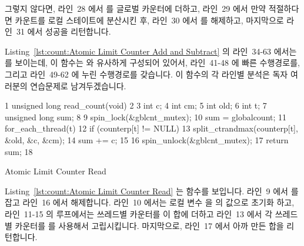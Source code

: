 그렇지 않다면, 라인~28 에서  를 글로벌 카운터에 더하고, 라인~29 에서
만약 적절하다면 카운트를 로컬 스테이트에 분산시킨 후, 라인~30 에서
 를 해제하고, 마지막으로 라인~31 에서 성공을 리턴합니다.

Listing~\ref{lst:count:Atomic Limit Counter Add and Subtract} 의 라인~34-63
에서는  를 보이는데, 이 함수는  와 유사하게
구성되어 있어서, 라인~41-48 에 빠른 수행경로를, 그리고 라인~49-62 에 누린
수행경로를 갖습니다.
이 함수의 각 라인별 분석은 독자 여러분의 연습문제로 남겨두겠습니다.

\begin{listing}[tbp]
{ \scriptsize
\begin{verbbox}
  1 unsigned long read_count(void)
  2 {
  3   int c;
  4   int cm;
  5   int old;
  6   int t;
  7   unsigned long sum;
  8 
  9   spin_lock(&gblcnt_mutex);
 10   sum = globalcount;
 11   for_each_thread(t)
 12     if (counterp[t] != NULL) {
 13       split_ctrandmax(counterp[t], &old, &c, &cm);
 14       sum += c;
 15     }
 16   spin_unlock(&gblcnt_mutex);
 17   return sum;
 18 }
\end{verbbox}
}
\centering
\theverbbox
\caption{Atomic Limit Counter Read}
\label{lst:count:Atomic Limit Counter Read}
\end{listing}

Listing~\ref{lst:count:Atomic Limit Counter Read} 는  함수를
보입니다.
라인~9 에서  를 잡고 라인~16 에서 해제합니다.
라인~10 에서는 로컬 변수  을  의 값으로 초기화 하고,
라인~11-15 의 루프에서는 쓰레드별 카운터를 이 합에 더하고 라인~13 에서 각
쓰레드별 카운터를  를 사용해서 고립시킵니다.
마지막으로, 라인~17 에서 아까 만든 합을 리턴합니다.

